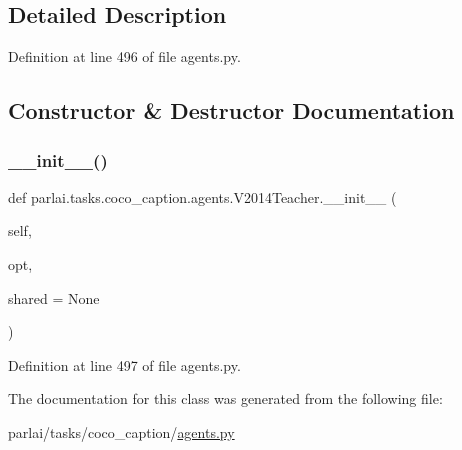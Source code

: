 \subsection{Detailed Description}


Definition at line 496 of file agents.\+py.



\subsection{Constructor \& Destructor Documentation}
\mbox{\label{classparlai_1_1tasks_1_1coco__caption_1_1agents_1_1V2014Teacher_a270de04c549341bc63faf54b5f448108}} 
\subsubsection{\texorpdfstring{\+\_\+\+\_\+init\+\_\+\+\_\+()}{\_\_init\_\_()}}
{\footnotesize\ttfamily def parlai.\+tasks.\+coco\+\_\+caption.\+agents.\+V2014\+Teacher.\+\_\+\+\_\+init\+\_\+\+\_\+ (\begin{DoxyParamCaption}\item[{}]{self,  }\item[{}]{opt,  }\item[{}]{shared = {\ttfamily None} }\end{DoxyParamCaption})}



Definition at line 497 of file agents.\+py.



The documentation for this class was generated from the following file\+:\begin{DoxyCompactItemize}
\item 
parlai/tasks/coco\+\_\+caption/\hyperlink{parlai_2tasks_2coco__caption_2agents_8py}{agents.\+py}\end{DoxyCompactItemize}
